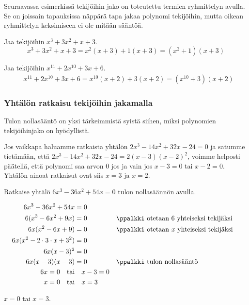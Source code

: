 Seuraavassa esimerkissä tekijöihin jako on toteutettu termien ryhmittelyn avulla. Se on joissain tapauksissa näppärä tapa jakaa polynomi tekijöihin, mutta oikean ryhmittelyn keksimiseen ei ole mitään sääntöä.

\begin{esimerkki}
Jaa tekijöihin $x^3+3x^2+x+3$.
\begin{equation*}
x^3+3x^2+x+3=x^2(x+3)+1(x+3)=(x^2+1)(x+3)
\end{equation*}
\end{esimerkki}

\begin{esimerkki}
Jaa tekijöihin $x^{11}+2x^{10}+3x+6$.
\begin{align*}
& x^{11}+2x^{10}+3x+6=x^{10}(x+2)+3(x+2)=(x^{10}+3)(x+2)
\end{align*}
\end{esimerkki}

\subsubsection*{Yhtälön ratkaisu tekijöihin jakamalla}

Tulon nollasääntö on yksi tärkeimmistä syistä siihen, miksi polynomien tekijöihinjako on hyödyllistä.

Jos vaikkapa haluamme ratkaista yhtälön $2x^3-14x^2+32x-24=0$ ja satumme tietämään, että $2x^3-14x^2+32x-24=2(x-3)(x-2)^2$,
voimme helposti päätellä, että polynomi saa arvon $0$ jos ja vain jos $x-3=0$ tai $x-2=0$. Yhtälön ainoat ratkaisut ovat siis $x=3$ ja $x=2$.

\begin{esimerkki}
Ratkaise yhtälö $6x^3-36x^2+54x=0$ tulon nollasäännön avulla.
\begin{esimratk}
\begin{align*}
6x^3-36x^2+54x &= 0 \\
6(x^3-6x^2+9x) &= 0 && \ppalkki \text{ otetaan } 6 \text{ yhteiseksi tekijäksi} \\
6x(x^2-6x+9) &= 0 && \ppalkki \text{ otetaan } x \text{ yhteiseksi tekijäksi} \\
6x(x^2-2\cdot 3\cdot x+3^2)  &= 0 \\
6x(x-3)^2 &= 0 & \\
6x(x-3)(x-3) &= 0 && \ppalkki \text{ tulon nollasääntö}\\
6x=0 \textrm{\quad tai}& \quad x-3=0 \\
x=0 \textrm{\quad tai}& \quad x=3 \\
\end{align*}
\end{esimratk}
\begin{esimvast}
$x=0$ tai $x=3$.
\end{esimvast}
\end{esimerkki}

